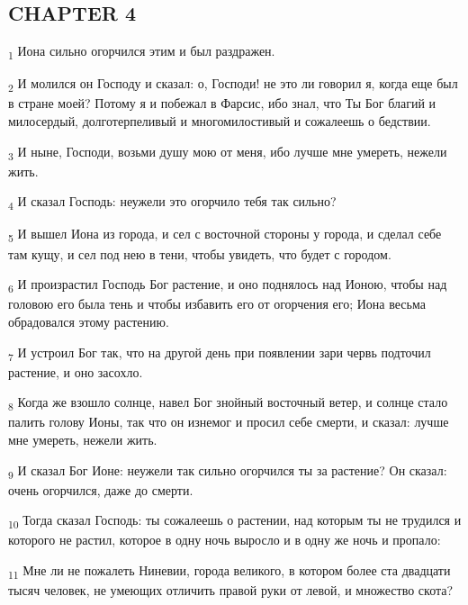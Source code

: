 \subsection{CHAPTER 4}
\begin{tcolorbox}
\textsubscript{1} Иона сильно огорчился этим и был раздражен.
\end{tcolorbox}
\begin{tcolorbox}
\textsubscript{2} И молился он Господу и сказал: о, Господи! не это ли говорил я, когда еще был в стране моей? Потому я и побежал в Фарсис, ибо знал, что Ты Бог благий и милосердый, долготерпеливый и многомилостивый и сожалеешь о бедствии.
\end{tcolorbox}
\begin{tcolorbox}
\textsubscript{3} И ныне, Господи, возьми душу мою от меня, ибо лучше мне умереть, нежели жить.
\end{tcolorbox}
\begin{tcolorbox}
\textsubscript{4} И сказал Господь: неужели это огорчило тебя так сильно?
\end{tcolorbox}
\begin{tcolorbox}
\textsubscript{5} И вышел Иона из города, и сел с восточной стороны у города, и сделал себе там кущу, и сел под нею в тени, чтобы увидеть, что будет с городом.
\end{tcolorbox}
\begin{tcolorbox}
\textsubscript{6} И произрастил Господь Бог растение, и оно поднялось над Ионою, чтобы над головою его была тень и чтобы избавить его от огорчения его; Иона весьма обрадовался этому растению.
\end{tcolorbox}
\begin{tcolorbox}
\textsubscript{7} И устроил Бог так, что на другой день при появлении зари червь подточил растение, и оно засохло.
\end{tcolorbox}
\begin{tcolorbox}
\textsubscript{8} Когда же взошло солнце, навел Бог знойный восточный ветер, и солнце стало палить голову Ионы, так что он изнемог и просил себе смерти, и сказал: лучше мне умереть, нежели жить.
\end{tcolorbox}
\begin{tcolorbox}
\textsubscript{9} И сказал Бог Ионе: неужели так сильно огорчился ты за растение? Он сказал: очень огорчился, даже до смерти.
\end{tcolorbox}
\begin{tcolorbox}
\textsubscript{10} Тогда сказал Господь: ты сожалеешь о растении, над которым ты не трудился и которого не растил, которое в одну ночь выросло и в одну же ночь и пропало:
\end{tcolorbox}
\begin{tcolorbox}
\textsubscript{11} Мне ли не пожалеть Ниневии, города великого, в котором более ста двадцати тысяч человек, не умеющих отличить правой руки от левой, и множество скота?
\end{tcolorbox}
